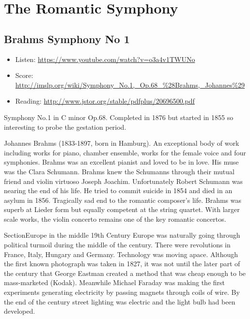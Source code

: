 
\chapter{The Romantic Symphony}
\label{romanticsymphony}


\section{Brahms Symphony No 1 }
\begin{itemize}
\item Listen: \url{https://www.youtube.com/watch?v=o3a4v1TWUNo}
\item Score: \url{http://imslp.org/wiki/Symphony_No.1,_Op.68_%28Brahms,_Johannes%29}
\item Reading: \url{http://www.jstor.org/stable/pdfplus/20696500.pdf}
\end{itemize}

Symphony No.1 in C minor Op.68. Completed in 1876 but started in 1855 so interesting to probe the gestation period. 

Johannes Brahms (1833-1897, born in Hamburg). An exceptional body of work including works for piano, chamber ensemble, works for the female voice and four symphonies. Brahms was an excellent pianist and loved to be in love. His muse was the Clara Schumann. Brahms knew the Schumanns through their mutual friend and violin virtuoso Joseph Joachim. Unfortunately Robert Schumann was nearing the end of his life. He tried to commit suicide in 1854 and died in an asylum in 1856. Tragically sad end to the romantic composer's life. Brahms was superb at Lieder form but equally competent at the string quartet. With larger scale works, the violin concerto remains one of the key romantic concertos. 

Section{Europe in the middle 19th Century}
Europe was naturally going through political turmoil during the middle of the century. There were revolutions in France, Italy, Hungary and Germany. Technology was moving apace. Although the first known photograph was taken in 1827, it was not until the later part of the century that George Eastman created a method that was cheap enough to be mass-marketed (Kodak). Meanwhile Michael Faraday was making the first experiments generating electricity by passing magnets through coils of wire. By the end of the century street lighting was electric and the light bulb had been developed. 

